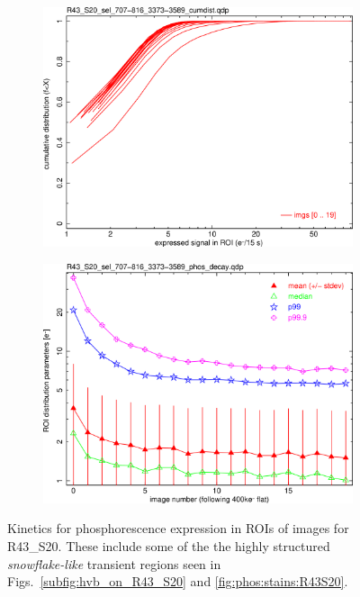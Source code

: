 \begin{figure}[!htbp]
\begin{subfigure}{0.45\textwidth}
  \includegraphics[width=\textwidth]{figures/phosphorescence-survey/phos_kinetics/R43_S20_sel_707-816_3373-3589_cumdist.png}    
\end{subfigure}
\hfil
\begin{subfigure}{0.45\textwidth}
  \centering
  \includegraphics[width=\textwidth]{figures/phosphorescence-survey/phos_kinetics/R43_S20_sel_707-816_3373-3589_phos_decay.png}
\end{subfigure}
\newline
\caption{Kinetics for phosphorescence expression in ROIs of images for R43\_S20. These include some of the the highly structured {\it snowflake-like} transient regions seen in Figs.~\ref{subfig:hvb_on_R43_S20} and \ref{fig:phos:stains:R43S20}.}
\label{fig:phos:kinetics:R43S20}
\end{figure}
